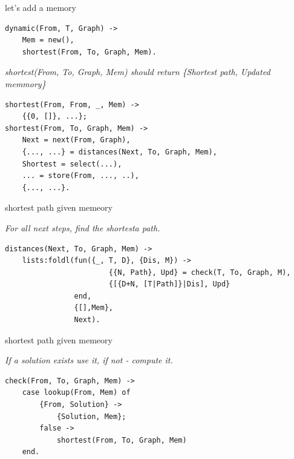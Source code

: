 \begin{frame}[fragile]{let's add a memory}

\begin{verbatim}
dynamic(From, T, Graph) ->
    Mem = new(),
    shortest(From, To, Graph, Mem).
\end{verbatim}

\pause\vspace{10pt}

{\em shortest(From, To, Graph, Mem) should return \{Shortest path, Updated memmory\}}

\pause\vspace{10pt}
\begin{verbatim}
shortest(From, From, _, Mem) ->
    {{0, []}, ...};
shortest(From, To, Graph, Mem) ->
    Next = next(From, Graph),
    {..., ...} = distances(Next, To, Graph, Mem),
    Shortest = select(...),
    ... = store(From, ..., ..),
    {..., ...}.
\end{verbatim}

\end{frame}

\begin{frame}[fragile]{shortest path given memeory}

\pause\vspace{10pt}

{\em For all next steps, find the shortesta path.}

\pause\vspace{10pt}

\begin{verbatim}
distances(Next, To, Graph, Mem) ->
    lists:foldl(fun({_, T, D}, {Dis, M}) ->     
                        {{N, Path}, Upd} = check(T, To, Graph, M),
                        {[{D+N, [T|Path]}|Dis], Upd}
                end, 
                {[],Mem},
                Next).    
\end{verbatim}
\end{frame}

\begin{frame}[fragile]{shortest path given memeory}

{\em If a solution exists use it, if not - compute it.}

\begin{verbatim}
check(From, To, Graph, Mem) ->
    case lookup(From, Mem) of
        {From, Solution} ->
            {Solution, Mem};
        false ->
            shortest(From, To, Graph, Mem)
    end.
\end{verbatim}
\end{frame}



